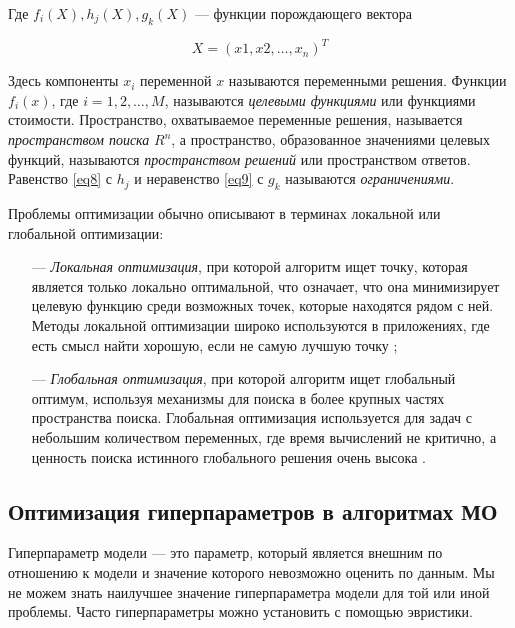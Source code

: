 Где $f_i(X), h_j(X), g_k(X)$ — функции порождающего вектора

\begin{equation}\label{eq10}
    X = (x1,x2,\dots,x_n)^T
\end{equation}

Здесь компоненты $x_i$ переменной $x$ называются переменными решения.
Функции $f_i(x)$, где $i = 1, 2, \dots, M$, называются \emph{целевыми функциями}
или функциями стоимости. Пространство, охватываемое переменные решения,
называется \emph{пространством поиска} $R^n$, а пространство, образованное значениями
целевых функций, называются \emph{пространством решений} или пространством ответов.
Равенство \eqref{eq8} с $h_j$ и неравенство \eqref{eq9} с $g_k$ называются \emph{ограничениями}.

Проблемы оптимизации обычно описывают в терминах локальной или глобальной
оптимизации:

\begin{itemize}
    \item[—]
        \emph{Локальная оптимизация}, при которой алгоритм ищет точку, которая является
        только локально оптимальной, что означает, что она минимизирует целевую
        функцию среди возможных точек, которые находятся рядом с ней. Методы локальной оптимизации широко используются в приложениях, где есть смысл
        найти хорошую, если не самую лучшую точку \cite{Boyd2004};

    \item[—]
        \emph{Глобальная оптимизация}, при которой алгоритм ищет глобальный оптимум,
        используя механизмы для поиска в более крупных частях пространства поиска.
        Глобальная оптимизация используется для задач с небольшим количеством
        переменных, где время вычислений не критично, а ценность поиска истинного
        глобального решения очень высока \cite{Boyd2004}.
\end{itemize}

\subsection{Оптимизация гиперпараметров в алгоритмах МО}\label{optimization}

Гиперпараметр модели — это параметр, который является внешним по
отношению к модели и значение которого невозможно оценить по данным.
Мы не можем знать наилучшее значение гиперпараметра модели для той или иной проблемы.
Часто гиперпараметры можно установить с помощью эвристики.


